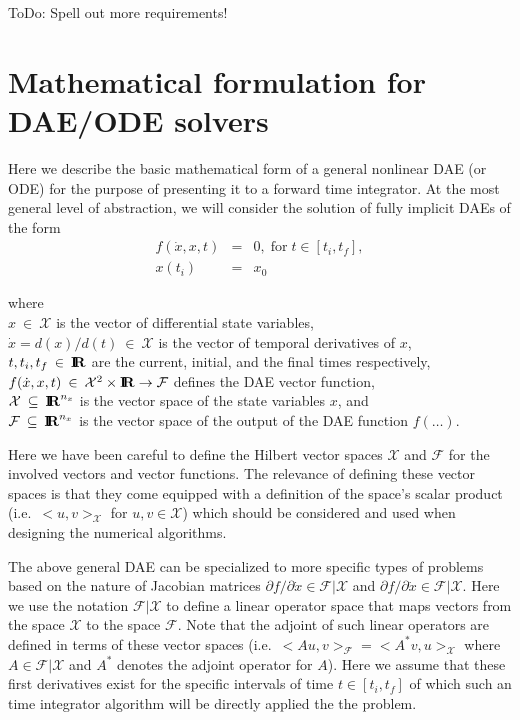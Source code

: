 \documentclass[pdf,ps2pdf,11pt]{SANDreport}
\begin{document}
ToDo: Spell out more requirements!

\section{Mathematical formulation for DAE/ODE solvers}

Here we describe the basic mathematical form of a general nonlinear DAE (or
ODE) for the purpose of presenting it to a forward time integrator.  At the
most general level of abstraction, we will consider the solution of fully
implicit DAEs of the form
%
\begin{eqnarray}
f(\dot{x},x,t) & = & 0, \; \mbox{for} \; t \in [t_i, t_f], \label{rythmos:eqn:dae} \\
x(t_i) & = & x_0 \label{rythmos:eqn:dae:ic}
\end{eqnarray}
\begin{tabbing}
\hspace{4ex}where\hspace{5ex}\= \\
\>	$x\:\in\:\mathcal{X}$ is the vector of differential state variables, \\
\>	$\dot{x} = d(x)/d(t)\:\in\:\mathcal{X}$ is the vector of temporal derivatives of $x$, \\
\>	$t, t_i, t_f\:\in\:\mbox{\textbf{I}}\hspace{-0.6ex}\mbox{\textbf{R}}$ are the current, initial, and the final times respectively, \\
\>	$f(\dot{x},x,t)\:\in\:\mathcal{X}^2\times\mbox{\textbf{I}}\hspace{-0.6ex}\mbox{\textbf{R}}\rightarrow\mathcal{F}$ defines the DAE vector function, \\
\>	$\mathcal{X} \:\subseteq\:\mbox{\textbf{I}}\hspace{-0.6ex}\mbox{\textbf{R}}^{n_x}$ is the vector space of the state variables $x$, and \\
\>	$\mathcal{F} \:\subseteq\:\mbox{\textbf{I}}\hspace{-0.6ex}\mbox{\textbf{R}}^{n_x}$ is the vector space of the output of the DAE function $f(\ldots)$.
\end{tabbing}

Here we have been careful to define the Hilbert vector spaces $\mathcal{X}$
and $\mathcal{F}$ for the involved vectors and vector functions.  The
relevance of defining these vector spaces is that they come equipped with a
definition of the space's scalar product (i.e.\ $<u,v>_{\mathcal{X}}$ for
$u,v\in\mathcal{X}$) which should be considered and used when designing the
numerical algorithms.

The above general DAE can be specialized to more specific types of problems
based on the nature of Jacobian matrices ${}\partial f / {}\partial
{}\dot{x}\in\mathcal{F}|\mathcal{X}$ and ${}\partial f / {}\partial
{}\dot{x}\in\mathcal{F}|\mathcal{X}$.  Here we use the notation
$\mathcal{F}|\mathcal{X}$ to define a linear operator space that maps vectors
from the space $\mathcal{X}$ to the space $\mathcal{F}$.  Note that the
adjoint of such linear operators are defined in terms of these vector spaces
(i.e.\ $<A u,v>_{\mathcal{F}} = <A^* v,u>_{\mathcal{X}}$ where
$A\in\mathcal{F}|\mathcal{X}$ and $A^*$ denotes the adjoint operator for $A$).
Here we assume that these first derivatives exist for the specific intervals
of time $t\in[t_i,t_f]$ of which such an time integrator algorithm will be
directly applied the the problem.
\end{document}
